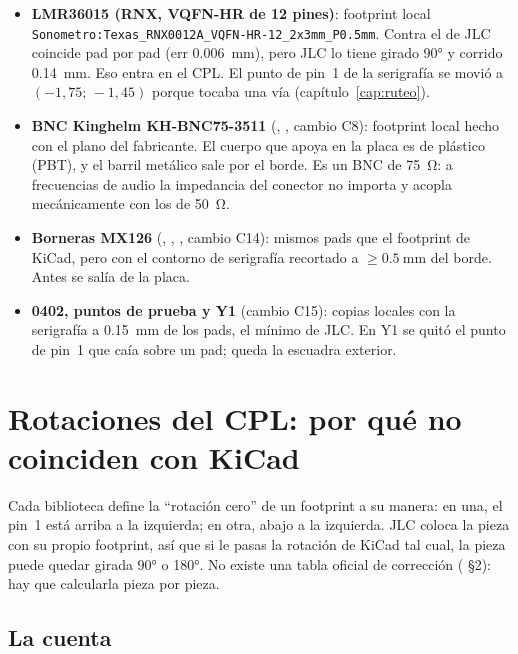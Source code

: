 \begin{itemize}
  \item \textbf{LMR36015 (RNX, VQFN-HR de 12 pines)}: footprint local \nolinkurl{Sonometro:Texas_RNX0012A_VQFN-HR-12_2x3mm_P0.5mm}. Contra el de JLC coincide pad por pad (err \SI{0.006}{\milli\meter}), pero JLC lo tiene girado \ang{90} y corrido \SI{0.14}{\milli\meter}. Eso entra en el CPL. El punto de pin~1 de la serigrafía se movió a $(-1{,}75;\,-1{,}45)$ porque tocaba una vía (capítulo~\ref{cap:ruteo}).
  \item \textbf{BNC Kinghelm KH-BNC75-3511} (, , cambio C8): footprint local hecho con el plano del fabricante. El cuerpo que apoya en la placa es de plástico (PBT), y el barril metálico sale por el borde. Es un BNC de \SI{75}{\ohm}: a frecuencias de audio la impedancia del conector no importa y acopla mecánicamente con los de \SI{50}{\ohm}.
  \item \textbf{Borneras MX126} (, , , cambio C14): mismos pads que el footprint de KiCad, pero con el contorno de serigrafía recortado a $\ge\SI{0.5}{\milli\meter}$ del borde. Antes se salía de la placa.
  \item \textbf{0402, puntos de prueba y Y1} (cambio C15): copias locales con la serigrafía a \SI{0.15}{\milli\meter} de los pads, el mínimo de JLC. En Y1 se quitó el punto de pin~1 que caía sobre un pad; queda la escuadra exterior.
\end{itemize}

\section{Rotaciones del CPL: por qué no coinciden con KiCad}\label{sec:c05-cpl}

Cada biblioteca define la ``rotación cero'' de un footprint a su manera: en una, el pin~1 está arriba a la izquierda; en otra, abajo a la izquierda. JLC coloca la pieza con su propio footprint, así que si le pasas la rotación de KiCad tal cual, la pieza puede quedar girada \ang{90} o \ang{180}. No existe una tabla oficial de corrección ( §2): hay que calcularla pieza por pieza.

\subsection{La cuenta}

